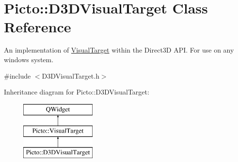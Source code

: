 \hypertarget{class_picto_1_1_d3_d_visual_target}{\section{Picto\-:\-:D3\-D\-Visual\-Target Class Reference}
\label{class_picto_1_1_d3_d_visual_target}
}


An implementation of \hyperlink{class_picto_1_1_visual_target}{Visual\-Target} within the Direct3\-D A\-P\-I. For use on any windows system.  




{\ttfamily \#include $<$D3\-D\-Visual\-Target.\-h$>$}

Inheritance diagram for Picto\-:\-:D3\-D\-Visual\-Target\-:\begin{figure}[H]
\begin{center}
\leavevmode
\includegraphics[height=3.000000cm]{class_picto_1_1_d3_d_visual_target}
\end{center}
\end{figure}
